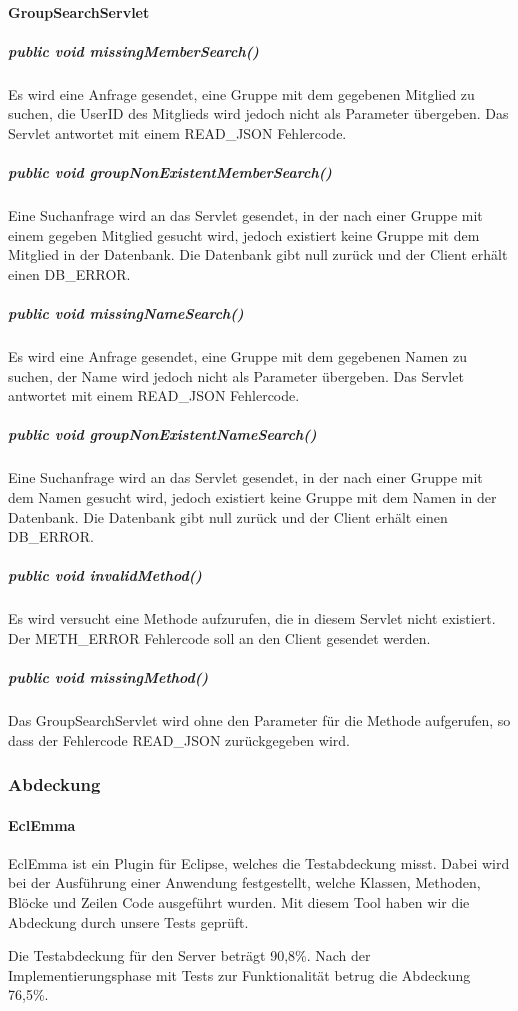 \documentclass{scrartcl}
\begin{document}
\paragraph{GroupSearchServlet}
\subparagraph{public void missingMemberSearch()}
Es wird eine Anfrage gesendet, eine Gruppe mit dem gegebenen Mitglied zu suchen, die UserID des Mitglieds wird jedoch nicht als Parameter übergeben. Das Servlet antwortet mit einem READ\_JSON Fehlercode.
\subparagraph{public void groupNonExistentMemberSearch()}
Eine Suchanfrage wird an das Servlet gesendet, in der nach einer Gruppe mit einem gegeben Mitglied gesucht wird, jedoch existiert keine Gruppe mit dem Mitglied in der Datenbank. Die Datenbank gibt null zurück und der Client erhält einen DB\_ERROR.
\subparagraph{public void missingNameSearch()}
Es wird eine Anfrage gesendet, eine Gruppe mit dem gegebenen Namen zu suchen, der Name wird jedoch nicht als Parameter übergeben. Das Servlet antwortet mit einem READ\_JSON Fehlercode.
\subparagraph{public void groupNonExistentNameSearch()}
Eine Suchanfrage wird an das Servlet gesendet, in der nach einer Gruppe mit dem Namen gesucht wird, jedoch existiert keine Gruppe mit dem Namen in der Datenbank. Die Datenbank gibt null zurück und der Client erhält einen DB\_ERROR.
\subparagraph{public void invalidMethod()}
Es wird versucht eine Methode aufzurufen, die in diesem Servlet nicht existiert. Der METH\_ERROR Fehlercode soll an den Client gesendet werden.
\subparagraph{public void missingMethod()}
Das GroupSearchServlet wird ohne den Parameter für die Methode aufgerufen, so dass der Fehlercode READ\_JSON zurückgegeben wird.

\newpage
\subsubsection{Abdeckung}
\paragraph{EclEmma}
EclEmma ist ein Plugin für Eclipse, welches die Testabdeckung misst. Dabei wird bei der Ausführung einer Anwendung festgestellt, welche Klassen, Methoden, Blöcke und Zeilen Code ausgeführt wurden. 
Mit diesem Tool haben wir die Abdeckung durch unsere Tests geprüft.


Die Testabdeckung für den Server beträgt 90,8\%.
Nach der Implementierungsphase mit Tests zur Funktionalität betrug die Abdeckung 76,5\%.
\end{document}
